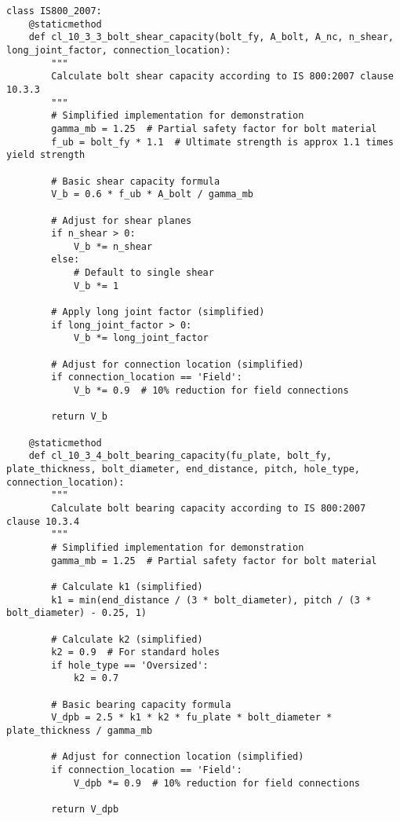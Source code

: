 \documentclass[12pt,a4paper]{article}
\begin{document}
\begin{lstlisting}
class IS800_2007:
    @staticmethod
    def cl_10_3_3_bolt_shear_capacity(bolt_fy, A_bolt, A_nc, n_shear, long_joint_factor, connection_location):
        """
        Calculate bolt shear capacity according to IS 800:2007 clause 10.3.3
        """
        # Simplified implementation for demonstration
        gamma_mb = 1.25  # Partial safety factor for bolt material
        f_ub = bolt_fy * 1.1  # Ultimate strength is approx 1.1 times yield strength
        
        # Basic shear capacity formula
        V_b = 0.6 * f_ub * A_bolt / gamma_mb
        
        # Adjust for shear planes
        if n_shear > 0:
            V_b *= n_shear
        else:
            # Default to single shear
            V_b *= 1
        
        # Apply long joint factor (simplified)
        if long_joint_factor > 0:
            V_b *= long_joint_factor
        
        # Adjust for connection location (simplified)
        if connection_location == 'Field':
            V_b *= 0.9  # 10% reduction for field connections
        
        return V_b

    @staticmethod
    def cl_10_3_4_bolt_bearing_capacity(fu_plate, bolt_fy, plate_thickness, bolt_diameter, end_distance, pitch, hole_type, connection_location):
        """
        Calculate bolt bearing capacity according to IS 800:2007 clause 10.3.4
        """
        # Simplified implementation for demonstration
        gamma_mb = 1.25  # Partial safety factor for bolt material
        
        # Calculate k1 (simplified)
        k1 = min(end_distance / (3 * bolt_diameter), pitch / (3 * bolt_diameter) - 0.25, 1)
        
        # Calculate k2 (simplified)
        k2 = 0.9  # For standard holes
        if hole_type == 'Oversized':
            k2 = 0.7
        
        # Basic bearing capacity formula
        V_dpb = 2.5 * k1 * k2 * fu_plate * bolt_diameter * plate_thickness / gamma_mb
        
        # Adjust for connection location (simplified)
        if connection_location == 'Field':
            V_dpb *= 0.9  # 10% reduction for field connections
        
        return V_dpb
\end{lstlisting}
\end{document}
